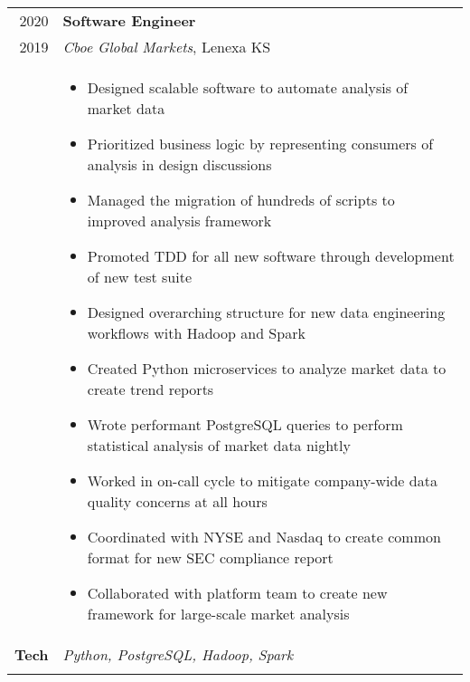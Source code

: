 \documentclass[a4paper,10pt]{article}
\newcommand{\br}{\\\multicolumn{2}{c}{}}
\begin{document}
\begin{tabular}{r p{15cm}}
  \textsc{2020}  & \textbf{Software Engineer} \\
  \textsc{2019}  & \textit{Cboe Global Markets}, Lenexa KS
  \\ &
       \begin{itemize}
       \item Designed scalable software to automate analysis of market data
       \item Prioritized business logic by representing consumers of analysis in design discussions
       \item Managed the migration of hundreds of scripts to improved analysis framework
       \item Promoted TDD for all new software through development of new test suite
       \item Designed overarching structure for new data engineering workflows with Hadoop and Spark
       \item Created Python microservices to analyze market data to create trend reports
       \item Wrote performant PostgreSQL queries to perform statistical analysis of market data nightly
       \item Worked in on-call cycle to mitigate company-wide data quality concerns at all hours
       \item Coordinated with NYSE and Nasdaq to create common format for new SEC compliance report
       \item Collaborated with platform team to create new framework for large-scale market analysis
       \end{itemize} \\
  \textbf{Tech} & \textit{Python, PostgreSQL, Hadoop, Spark} \br \\
\end{tabular}
\end{document}
